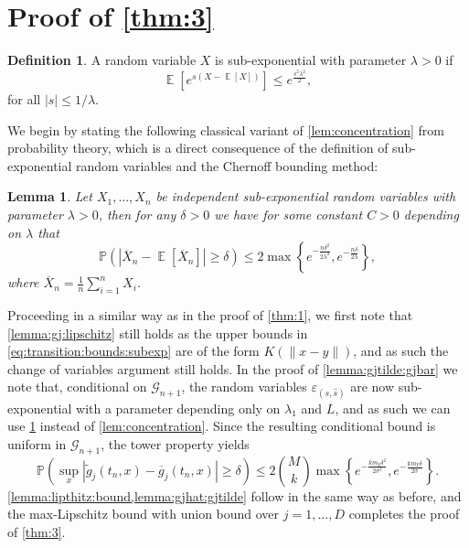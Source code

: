 \documentclass[11pt,reqno,a4paper]{amsart}
\newtheorem{lemma}[theorem]{Lemma}
\theoremstyle{definition}
\newtheorem{definition}[theorem]{Definition}
\numberwithin{equation}{section}
\newcommand{\widebar}[1]{\overline{#1}}
\renewcommand{\P}{\mathbb{P}}
\DeclareMathOperator{\E}{\mathbb{E}}
\DeclareMathOperator{\1}{\mathbbm{1}}
\begin{document}
\section{Proof of \cref{thm:3}}
\begin{definition} \label{def:subexponential}
  A random variable $X$ is sub-exponential with parameter $\lambda > 0$ if
  \begin{equation}
    \E[e^{s (X-\E[X])}] \leq e^{\frac{s^2 \lambda^2}{2}},
  \end{equation}
  for all $|s| \leq 1/\lambda$.
\end{definition}
We begin by stating the following classical variant of \cref{lem:concentration} from probability theory, which is a direct consequence of the definition of sub-exponential random variables and the Chernoff bounding method:
\begin{lemma} \label{lem:subexponential}
  Let $X_1,\ldots,X_n$ be independent sub-exponential random variables with parameter $\lambda > 0$, then for any $\delta > 0$ we have for some constant $C > 0$ depending on $\lambda$ that
  \begin{equation*}
    \P \left ( \left \lvert \overline{X}_n-\E[\overline{X}_n] \right \rvert  \geq \delta \right ) \leq
    2\max \left \{ e^{-\frac{n \delta^2}{2 \lambda^2}}, e^{-\frac{n \delta}{2 \lambda}} \right \},
  \end{equation*}
  where $\overline{X}_n = \frac{1}{n} \sum_{i=1}^n X_i$.
\end{lemma}

Proceeding in a similar way as in the proof of \cref{thm:1}, we first note that \cref{lemma:gj:lipschitz} still holds as the upper bounds in \cref{eq:transition:bounds:subexp} are of the form $K(\|x-y\|)$, and as such the change of variables argument still holds. In the proof of \cref{lemma:gjtilde:gjbar} we note that, conditional on $\mathcal{G}_{n+1}$, the random variables $\varepsilon_{(s,\hat s)}$ are now sub-exponential with a parameter depending only on $\lambda_1$ and $L$, and as such we can use \cref{lem:subexponential} instead of \cref{lem:concentration}. Since the resulting conditional bound is uniform in $\mathcal{G}_{n+1}$, the tower property yields
\begin{equation*}
  \P\left (\sup_x |\widetilde{g}_j(t_n,x) - \widebar{g}_j(t_n,x)| \geq \delta \right ) \leq 2 {\binom{M}{k}} \max \left \{ e^{-\frac{k m_Y \delta^2}{2 \sigma^2} }, e^{-\frac{k m_Y \delta}{2 \sigma}}\right \}.
\end{equation*}
\cref{lemma:lipthitz:bound,lemma:gjhat:gjtilde} follow in the same way as before, and the max-Lipschitz bound with union bound over $j = 1,\dots,D$ completes the proof of \cref{thm:3}.
\end{document}

